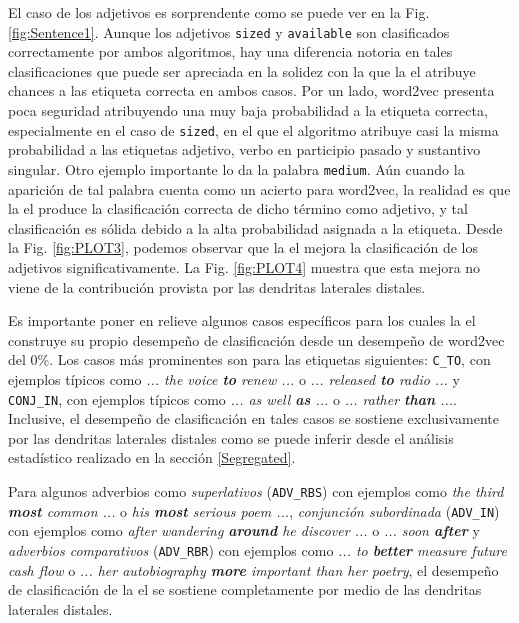 El caso de los adjetivos es sorprendente como se puede ver en la Fig. \ref{fig:Sentence1}.
Aunque los adjetivos \texttt{sized} y \texttt{available} son clasificados correctamente por ambos algoritmos, hay una diferencia notoria en tales clasificaciones que puede ser apreciada en la solidez con la que la \gls{el} atribuye chances a las etiqueta correcta en ambos casos.
Por un lado, word2vec presenta poca seguridad atribuyendo una muy baja probabilidad a la etiqueta correcta, especialmente en el caso de \texttt{sized}, en el que el algoritmo atribuye casi la misma probabilidad a las etiquetas adjetivo, verbo en participio pasado y sustantivo singular.
Otro ejemplo importante lo da la palabra \texttt{medium}.
Aún cuando la aparición de tal palabra cuenta como un acierto para word2vec, la realidad es que la \gls{el} produce la clasificación correcta de dicho término como adjetivo, y tal clasificación es sólida debido a la alta probabilidad asignada a la etiqueta.
Desde la Fig. \ref{fig:PLOT3}, podemos observar que la \gls{el} mejora la clasificación de los adjetivos significativamente.
La Fig. \ref{fig:PLOT4} muestra que esta mejora no viene de la contribución provista por las dendritas laterales distales.

Es importante poner en relieve algunos casos específicos para los cuales la \gls{el} construye su propio desempeño de clasificación desde un desempeño de word2vec del 0\%.
Los casos más prominentes son para las etiquetas siguientes:
\texttt{C\_TO}, con ejemplos típicos como \emph{... the voice \textbf{to} renew ...} o \emph{... released \textbf{to} radio ...} y
\texttt{CONJ\_IN}, con ejemplos típicos como \emph{... as well \textbf{as} ...} o \emph{... rather \textbf{than} ...}.
Inclusive, el desempeño de clasificación en tales casos se sostiene exclusivamente por las dendritas laterales distales como se puede inferir desde el análisis estadístico realizado en la sección \ref{Segregated}.

Para algunos adverbios como
\emph{superlativos} (\texttt{ADV\_RBS}) con ejemplos como \emph{the third \textbf{most} common ...} o \emph{his \textbf{most} serious poem ...}, \emph{conjunción subordinada} (\texttt{ADV\_IN}) con ejemplos como \emph{after wandering \textbf{around} he discover ...} o \emph{... soon \textbf{after}} y \emph{adverbios comparativos} (\texttt{ADV\_RBR}) con ejemplos como \emph{... to \textbf{better} measure future cash flow} o \emph{... her autobiography \textbf{more} important than her poetry}, el desempeño de clasificación de la \gls{el} se sostiene completamente por medio de las dendritas laterales distales.

